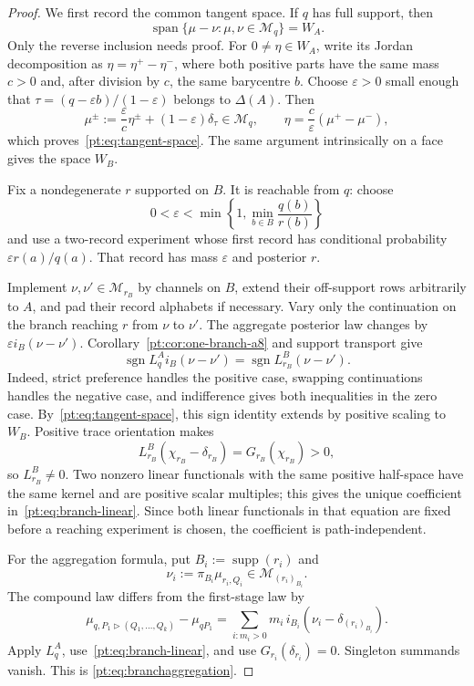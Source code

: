 \begin{proof}
We first record the common tangent space.  If $q$ has full support, then
\begin{equation}
 \operatorname{span}\{\mu-\nu:\mu,\nu\in\mathcal M_q\}=W_A.
\label{pt:eq:tangent-space}
\end{equation}
Only the reverse inclusion needs proof.  For $0\ne\eta\in W_A$, write its
Jordan decomposition as $\eta=\eta^+-\eta^-$, where both positive parts have
the same mass $c>0$ and, after division by $c$, the same barycentre $b$.
Choose $\varepsilon>0$ small enough that
$\tau=(q-\varepsilon b)/(1-\varepsilon)$ belongs to $\Delta(A)$.  Then
\[
 \mu^\pm:=\frac{\varepsilon}{c}\eta^\pm
          +(1-\varepsilon)\delta_\tau
 \in\mathcal M_q,
 \qquad
 \eta=\frac c\varepsilon(\mu^+-\mu^-),
\]
which proves~\eqref{pt:eq:tangent-space}.  The same argument intrinsically on
a face gives the space $W_B$.

Fix a nondegenerate $r$ supported on $B$.  It is reachable from $q$: choose
\[
 0<\varepsilon<\min\left\{1,
       \min_{b\in B}\frac{q(b)}{r(b)}\right\}
\]
and use a two-record experiment whose first record has conditional probability
$\varepsilon r(a)/q(a)$.  That record has mass $\varepsilon$ and posterior
$r$.

Implement $\nu,\nu'\in\mathcal M_{r_B}$ by channels on $B$, extend their
off-support rows arbitrarily to $A$, and pad their record alphabets if
necessary.  Vary only the continuation on the branch reaching $r$ from
$\nu$ to $\nu'$.  The aggregate posterior law changes by
$\varepsilon i_B(\nu-\nu')$.  Corollary~\ref{pt:cor:one-branch-a8} and
support transport give
\[
 \operatorname{sgn}L_q^Ai_B(\nu-\nu')
 =\operatorname{sgn}L_{r_B}^B(\nu-\nu').
\]
Indeed, strict preference handles the positive case, swapping continuations
handles the negative case, and indifference gives both inequalities in the
zero case.  By~\eqref{pt:eq:tangent-space}, this sign identity extends by
positive scaling to $W_B$.  Positive trace orientation makes
\[
 L_{r_B}^B(\chi_{r_B}-\delta_{r_B})
 =G_{r_B}(\chi_{r_B})>0,
\]
so $L_{r_B}^B\ne0$.  Two nonzero linear functionals with the same positive
half-space have the same kernel and are positive scalar multiples; this gives
the unique coefficient in~\eqref{pt:eq:branch-linear}.  Since both linear
functionals in that equation are fixed before a reaching experiment is
chosen, the coefficient is path-independent.

For the aggregation formula, put $B_i:=\operatorname{supp}(r_i)$ and
\[
 \nu_i:=\pi_{B_i}\mu_{r_i,Q_i}\in\mathcal M_{(r_i)_{B_i}}.
\]
The compound law differs from the first-stage law by
\[
 \mu_{q,P_1\triangleright(Q_1,\ldots,Q_k)}-\mu_{qP_1}
 =\sum_{i:m_i>0}m_i\,i_{B_i}
   (\nu_i-\delta_{(r_i)_{B_i}}).
\]
Apply $L_q^A$, use~\eqref{pt:eq:branch-linear}, and use
$G_{r_i}(\delta_{r_i})=0$.  Singleton summands vanish.  This is
\eqref{pt:eq:branchaggregation}.
\end{proof}

